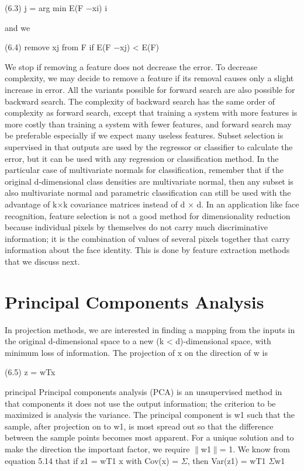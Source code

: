 (6.3) j = arg min E(F $-$xi) i

and we

(6.4) remove xj from F if E(F $-$xj) < E(F)

We stop if removing a feature does not decrease the error. To decrease complexity, we may decide to remove a feature if its removal causes only a slight increase in error. All the variants possible for forward search are also possible for backward search. The complexity of backward search has the same order of complexity as forward search, except that training a system with more features is more costly than training a system with fewer features, and forward search may be preferable especially if we expect many useless features. Subset selection is supervised in that outputs are used by the regressor or classifier to calculate the error, but it can be used with any regression or classification method. In the particular case of multivariate normals for classification, remember that if the original d-dimensional class densities are multivariate normal, then any subset is also multivariate normal and parametric classification can still be used with the advantage of k$\times$k covariance matrices instead of d $\times$ d. In an application like face recognition, feature selection is not a good method for dimensionality reduction because individual pixels by themselves do not carry much discriminative information; it is the combination of values of several pixels together that carry information about the face identity. This is done by feature extraction methods that we discuss next.

\section{Principal Components Analysis}

In projection methods, we are interested in finding a mapping from the inputs in the original d-dimensional space to a new (k < d)-dimensional space, with minimum loss of information. The projection of x on the direction of w is

(6.5) z = wTx

principal Principal components analysis (PCA) is an unsupervised method in that components it does not use the output information; the criterion to be maximized is analysis the variance. The principal component is w1 such that the sample, after projection on to w1, is most spread out so that the difference between the sample points becomes most apparent. For a unique solution and to make the direction the important factor, we require $\parallel$w1$\parallel$= 1. We know from equation 5.14 that if z1 = wT1 x with Cov(x) = $\Sigma$, then Var(z1) = wT1 $\Sigma$w1

